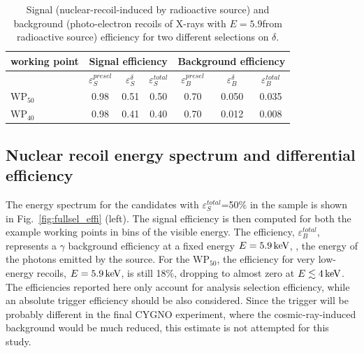 \begin{table}[t]

\caption{Signal (nuclear-recoil-induced by \ambe radioactive source) and background (photo-electron recoils of X-rays
         with $E=5.9$\keV from \fe radioactive source) efficiency for
         two different selections on $\delta$.\label{tab:roc}}

\vspace{10pt}
\normalsize
\centering
\begin{tabular}{l c c c | c c c }
  \hline\hline
  working point & \multicolumn{3}{c}{Signal efficiency} & \multicolumn{3}{c}{Background efficiency} \\
  \hline
  & $\varepsilon_{S}^{presel}$ & $\varepsilon_{S}^{\delta}$ & $\varepsilon_{S}^{total}$ & $\varepsilon_{B}^{presel}$ & $\varepsilon_{B}^{\delta}$ & $\varepsilon_{B}^{total}$ \\
  \hline
  $\mathrm{WP}_{50}$  & 0.98                        & 0.51                      & 0.50                     & 0.70                     & 0.050                     & 0.035 \\
  $\mathrm{WP}_{40}$  & 0.98                        & 0.41                      & 0.40                     & 0.70                     & 0.012                     & 0.008 \\
  \hline\hline
\end{tabular}
\end{table}



\subsection{Nuclear recoil energy spectrum and differential efficiency}

The energy spectrum for the candidates with
$\varepsilon_{S}^{total}$=50\% in the \ambe sample is shown in
Fig.~\ref{fig:fullsel_effi} (left).  The signal efficiency is then
computed for both the example working points in bins of the visible
energy. The efficiency, $\varepsilon_{B}^{total}$, represents a
$\gamma$ background efficiency at a fixed energy $E=5.9\,\textrm{ke\hspace{-.08em}V}$, \ie, the
energy of the photons emitted by the \fe source. For the
$\mathrm{WP}_{50}$, the efficiency for very low-energy recoils,
$E=5.9\,\textrm{ke\hspace{-.08em}V}$, is still 18\%, dropping to almost zero at
$E\lesssim4\,\textrm{ke\hspace{-.08em}V}$. The efficiencies reported here only account for
analysis selection efficiency, while an absolute trigger efficiency
should be also considered.  Since the trigger will be probably
different in the final CYGNO experiment, where the cosmic-ray-induced
background would be much reduced, this estimate is not attempted for
this study.

